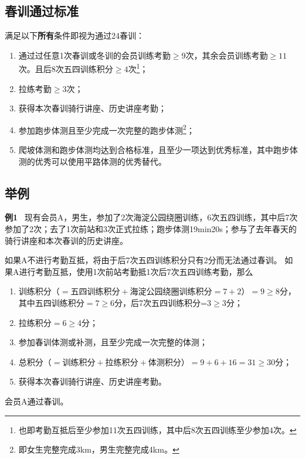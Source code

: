 \documentclass[UTF8]{ctexart}
\begin{document}
\subsection{春训通过标准}

满足以下\textbf{所有}条件即视为通过24春训：
\begin{enumerate}[nosep,left=4em]
    \item 通过过任意1次春训或冬训的会员训练考勤$\ge 9$次，其余会员训练考勤$\ge 11$次。且后8次五四训练积分$\ge 4$次\footnote{也即考勤互抵后至少参加11次五四训练，其中后8次五四训练至少参加4次。}；
    \item 拉练考勤$\ge 3$次；
    \item 获得本次春训骑行讲座、历史讲座考勤；
    \item 参加跑步体测且至少完成一次完整的跑步体测\footnote{即女生完整完成3km，男生完整完成4km。}；
    \item 爬坡体测和跑步体测均达到合格标准，且至少一项达到优秀标准，其中跑步体测的优秀可以使用平路体测的优秀替代。
\end{enumerate}

\subsection{举例}
\small{
    \textbf{例1} \ 现有会员A，男生，参加了2次海淀公园绕圈训练，6次五四训练，其中后7次参加了2次；去了1次前站和3次正式拉练；跑步体测19min20s；参与了去年春天的骑行讲座和本次春训的历史讲座。

如果A不进行考勤互抵，将由于后7次五四训练积分只有2分而无法通过春训。
如果A进行考勤互抵，使用1次前站考勤抵1次后7次五四训练考勤，那么
\begin{enumerate}[nosep,left=4em]
    \item 训练积分（$=\text{五四训练积分}+\text{海淀公园绕圈训练积分}=7+2$）$=9\ge 8$分，其中五四训练积分$=7\ge 6$分，后7次五四训练积分=3$\ge 3$分；
    \item 拉练积分$=6\ge 4$分；
    \item 参加春训体测或补测，且至少完成一次完整的体测；
    \item 总积分（$=\text{训练积分}+\text{拉练积分}+\text{体测积分}$）$=9+6+16=31\ge 30$分；
    \item 获得本次春训骑行讲座、历史讲座考勤。
\end{enumerate}

会员A通过春训。\\
}
\end{document}
